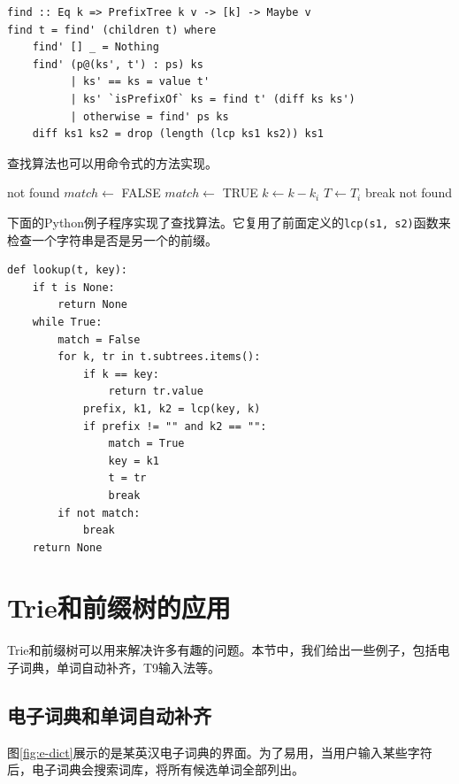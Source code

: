 \documentclass[b5paper]{ctexart}
\begin{document}
\lstset{language=Haskell}
\begin{lstlisting}[style=Haskell]
find :: Eq k => PrefixTree k v -> [k] -> Maybe v
find t = find' (children t) where
    find' [] _ = Nothing
    find' (p@(ks', t') : ps) ks
          | ks' == ks = value t'
          | ks' `isPrefixOf` ks = find t' (diff ks ks')
          | otherwise = find' ps ks
    diff ks1 ks2 = drop (length (lcp ks1 ks2)) ks1
\end{lstlisting}

查找算法也可以用命令式的方法实现。

\begin{algorithmic}[1]
     \State \Return not found
   \EndIf
  \Repeat
    \State $match \gets$ FALSE
        \State \Return {}
      \EndIf
        \State $match \gets$ TRUE
        \State $k \gets k - k_i$
        \State $T \gets T_i$
        \State break
      \EndIf
    \EndFor
  \State \Return not found
\EndFunction
\end{algorithmic}

下面的Python例子程序实现了查找算法。它复用了前面定义的\texttt{lcp(s1, s2)}函数来检查一个字符串是否是另一个的前缀。

\lstset{language=Python}
\begin{lstlisting}
def lookup(t, key):
    if t is None:
        return None
    while True:
        match = False
        for k, tr in t.subtrees.items():
            if k == key:
                return tr.value
            prefix, k1, k2 = lcp(key, k)
            if prefix != "" and k2 == "":
                match = True
                key = k1
                t = tr
                break
        if not match:
            break
    return None
\end{lstlisting}


\section{Trie和前缀树的应用}

Trie和前缀树可以用来解决许多有趣的问题。本节中，我们给出一些例子，包括电子词典，单词自动补齐，T9输入法等。

\subsection{电子词典和单词自动补齐}
图\ref{fig:e-dict}展示的是某英汉电子词典的界面。为了易用，当用户输入某些字符后，电子词典会搜索词库，将所有候选单词全部列出。
\end{document}
